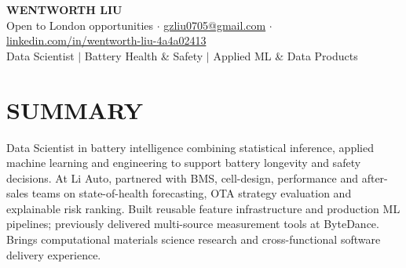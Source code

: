 \documentclass[a4paper,10pt]{article}
\begin{document}
\fontsize{9.8pt}{11.2pt}\selectfont

\begin{center}
{\Large\bfseries WENTWORTH LIU}\\[2pt]
{\small Open to London opportunities \;$\cdot$\; \href{mailto:gzliu0705@gmail.com}{gzliu0705@gmail.com} \;$\cdot$\; \href{https://www.linkedin.com/in/wentworth-liu-4a4a02413}{linkedin.com/in/wentworth-liu-4a4a02413}}\\[2pt]
{\small Data Scientist \;$\vert$\; Battery Health \& Safety \;$\vert$\; Applied ML \& Data Products}
\end{center}
\vspace{-4pt}

\section{SUMMARY}
Data Scientist in battery intelligence combining statistical inference, applied machine learning and engineering to support battery longevity and safety decisions. At Li Auto, partnered with BMS, cell-design, performance and after-sales teams on state-of-health forecasting, OTA strategy evaluation and explainable risk ranking. Built reusable feature infrastructure and production ML pipelines; previously delivered multi-source measurement tools at ByteDance. Brings computational materials science research and cross-functional software delivery experience.
\end{document}
